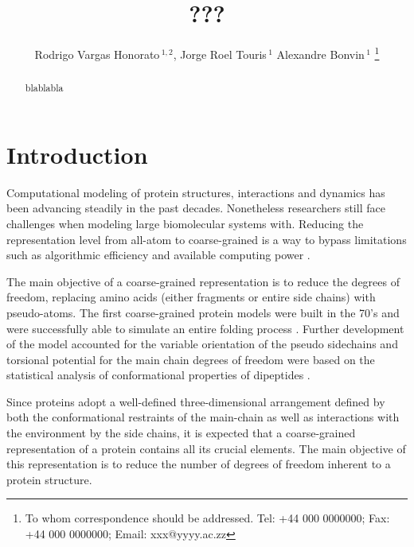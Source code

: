 \documentclass[a4,center,fleqn]{NAR}
\begin{document}
\title{???}

\author{%
Rodrigo Vargas Honorato\,$^{1,2}$,
Jorge Roel Touris\,$^{1}$
Alexandre Bonvin\,$^1$%
\footnote{To whom correspondence should be addressed.
Tel: +44 000 0000000; Fax: +44 000 0000000; Email: xxx@yyyy.ac.zz}}

\address{%
$^{1}$Bijvoet Center for Biomolecular Research, Faculty of Science, Utrecht University, Utrecht 3584CH, the Netherlands
$^{2}$Brazilian Biosciences National Laboratory (LNBio), Brazilian Center for Research in Energy and Materials (CNPEM), Zip Code 13083-970, Campinas, Sao Paulo, Brazil.}


\maketitle

\begin{abstract}
blablabla
\end{abstract}


\section{Introduction}

Computational modeling of protein structures, interactions and dynamics has been advancing steadily in the past decades. Nonetheless researchers still face challenges when modeling large biomolecular systems with. Reducing the representation level from all-atom to coarse-grained is a way to bypass limitations such as algorithmic efficiency and available computing power \cite{Vendruscolo2011}.

The main objective of a coarse-grained representation is to reduce the degrees of freedom, replacing amino acids (either fragments or entire side chains) with pseudo-atoms. The first coarse-grained protein models were built in the 70's and were successfully able to simulate an entire folding process \cite{Levitt1975}. Further development of the model accounted for the variable orientation of the pseudo sidechains and torsional potential for the main chain degrees of freedom were based on the statistical analysis of conformational properties of dipeptides \cite{Levitt1976}. 

Since proteins adopt a well-defined three-dimensional arrangement defined by both the conformational restraints of the main-chain as well as interactions with the environment by the side chains, it is expected that a coarse-grained representation of a protein contains all its crucial elements. The main objective of this representation is to reduce the number of degrees of freedom inherent to a protein structure. 
\end{document}
